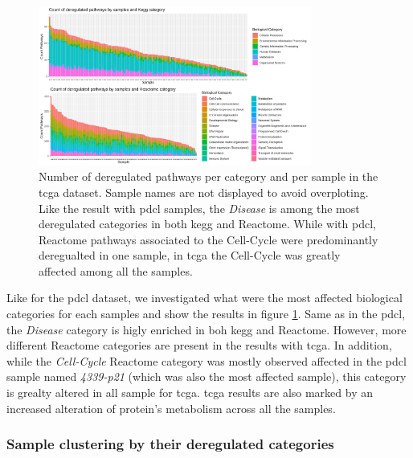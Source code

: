 \begin{figure}
    \begin{center}
        \includegraphics[width=0.8\textwidth]{img/barplot-categ-tcga}
        \caption{
            Number of deregulated pathways per category and per sample in the \acrshort{tcga} dataset.
            Sample names are not displayed to avoid overploting.
            Like the result with \acrshort{pdcl} samples, the \textit{Disease} is among the most deregulated categories in both \acrshort{kegg} and Reactome.
            While with \acrshort{pdcl}, Reactome pathways associated to the Cell-Cycle were predominantly deregualted in one sample, in \acrshort{tcga} the Cell-Cycle was greatly affected among all the samples.
        }
        \label{fig:barplot-categ-tcga}
    \end{center}
\end{figure}

Like for the \acrshort{pdcl} dataset, we investigated what were the most affected biological categories for each samples and show the results in figure \ref*{fig:barplot-categ-tcga}.
Same as in the \acrshort{pdcl}, the \textit{Disease} category is higly enriched in boh \acrshort{kegg} and Reactome.
However, more different Reactome categories are present in the results with \acrshort{tcga}.
In addition, while the \textit{Cell-Cycle} Reactome category was mostly observed affected in the \acrshort{pdcl} sample named \textit{4339-p21} (which was also the most affected sample), this category is grealty altered in all sample for \acrshort{tcga}.
\acrshort{tcga} results are also marked by an increased alteration of protein's metabolism across all the samples.

\subsubsection{Sample clustering by their deregulated categories}

